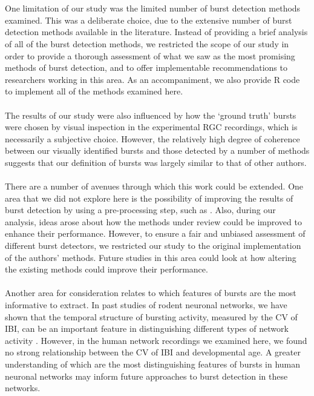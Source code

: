 \documentclass[12pt, titlepage]{article}
\begin{document}
	\\ \\One limitation of our study was the limited number of burst detection methods examined. This was a deliberate choice, due to the extensive number of burst detection methods available in the literature. Instead of providing a brief analysis of all of the burst detection methods, we restricted the scope of our study in order to provide a thorough assessment of what we saw as the most promising methods of burst detection, and to offer implementable recommendations to researchers working in this area. As an accompaniment, we also provide R code to implement all of the methods examined here.
	\\ \\The results of our study were also influenced by how the `ground truth' bursts were chosen by visual inspection in the experimental RGC recordings, which is necessarily a subjective choice. However, the relatively high degree of coherence between our visually identified bursts and those detected by a number of methods suggests that our definition of bursts was largely similar to that of other authors.
	\\ \\There are a number of avenues through which this work could be extended. One area that we did not explore here is the possibility of improving the results of burst detection by using a pre-processing step, such as \cite{Martens2014}. Also, during our analysis, ideas arose about how the methods under review could be improved to enhance their performance. However, to ensure a fair and unbiased assessment of different burst detectors, we restricted our study to the original implementation of the authors' methods. Future studies in this area could look at how altering the existing methods could improve their performance. 
	\\ \\ Another area for consideration relates to which features of bursts are the most informative to extract. In past studies of rodent neuronal networks, we have shown that the temporal structure of bursting activity, measured by the CV of IBI, can be an important feature in distinguishing different types of network activity \cite{Charlesworth2015}. However, in the human network recordings we examined here, we found no strong relationship between the CV of IBI and developmental age. A greater understanding of which are the most distinguishing features of bursts in human neuronal networks may inform future approaches to burst detection in these networks. 
\end{document}
